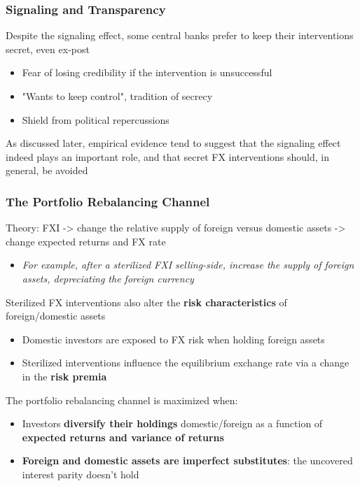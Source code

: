 \documentclass{beamer}
\newenvironment{wideitemize}{\itemize\addtolength{\itemsep}{10pt}}{\enditemize}
\begin{document}
\begin{frame}
  \frametitle{Signaling and Transparency}
  \begin{wideitemize}
  \item Despite the signaling effect, some central banks prefer to keep their interventions secret, even ex-post
    \begin{itemize}
    \item Fear of losing credibility if the intervention is unsuccessful
    \item "Wants to keep control", tradition of secrecy
    \item Shield from political repercussions
    \end{itemize}
  \item As discussed later, empirical evidence tend to suggest that the signaling effect indeed plays an important role, and that secret FX interventions should, in general, be avoided
\end{frame}

   
\begin{frame}
  \frametitle{The Portfolio Rebalancing Channel}
  \begin{wideitemize}
  \item Theory: FXI -> change the relative supply of foreign versus domestic assets -> change expected returns and FX rate
    \begin{itemize}
    \item \emph{For example, after a sterilized FXI selling-side, increase the supply of foreign assets, depreciating the foreign currency}
    \end{itemize}

  \item Sterilized FX interventions also alter the \textbf{risk characteristics} of foreign/domestic assets
    \begin{itemize}
    \item Domestic investors are exposed to FX risk when holding foreign assets
    \item Sterilized interventions influence the equilibrium exchange rate via a change in the \textbf{risk premia}
    \end{itemize}

  \item The portfolio rebalancing channel is maximized when:\\
    
  \begin{itemize}    
  \item Investors \textbf{diversify their holdings} domestic/foreign as a function of \textbf{expected returns and variance of returns}
  \item \textbf{Foreign and domestic assets are imperfect substitutes}: the uncovered interest parity doesn't hold   
  \end{itemize}    
  \end{wideitemize}
\end{frame}
\end{document}
